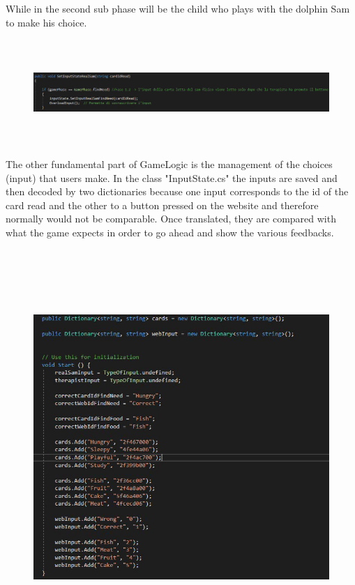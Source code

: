 \documentclass [12pt]{article}
\begin{document}
\begin{itemize}[•]
While in the second sub phase will be the child who plays with the dolphin Sam to make his choice.\\

\begin{figure}[ht!]
\centering
\includegraphics[height=4cm,width=17cm]{SubFase2.jpg}
\end{figure}

The other fundamental part of GameLogic is the management of the choices (input) that users make. In the class "InputState.cs" the inputs are saved and then decoded by two dictionaries because one input corresponds to the id of the card read and the other to a button pressed on the website and therefore normally would not be comparable. Once translated, they are compared with what the game expects in order to go ahead and show the various feedbacks.


\begin{figure}[ht!]
\centering
\includegraphics[height=15cm,width=13cm]{InputDictionary.jpg}
\end{figure}
\clearpage


\end{itemize}
\end{document}
